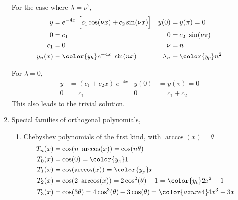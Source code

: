\begin{enumerate}
          For the case where $ \lambda = \nu^2 $,
          \begin{align}
              y         & = e^{-4x}\ \Big[ c_1 \cos(\nu x) + c_2 \sin(\nu x) \Big] &
              y(0)      & = y(\pi) = 0                                               \\
              0         & = c_1                                                    &
              0         & = c_2\ \sin(\nu \pi)                                       \\
              c_1       & = 0                                                      &
              \nu       & = n                                                        \\
              y_n(x)    & = \color{y_h} e^{-4x}\ \sin(nx)                          &
              \lambda_n & = \color{y_p} n^2
          \end{align}

          For $ \lambda = 0 $,
          \begin{align}
              y    & = (c_1 + c_2x)\ e^{-4x} &
              y(0) & = y(\pi) = 0              \\
              0    & = c_1                   &
              0    & = c_1 + c_2
          \end{align}
          This also leads to the trivial solution.

    \item Special families of orthogonal polynomials,
          \begin{enumerate}
              \item Chebyshev polynomials of the first kind, with
                    $ \arccos(x) = \theta $
                    \begin{align}
                        T_n(x) & = \cos (n\ \arccos(x)) = \cos(n\theta)             \\
                        T_0(x) & = \cos(0) = \color{y_h} 1                          \\
                        T_1(x) & = \cos(\arccos(x)) = \color{y_p} x                 \\
                        T_2(x) & = \cos(2\ \arccos(x)) = 2 \cos^2(\theta) - 1
                        = \color{y_t} 2x^2 - 1                                      \\
                        T_3(x) & = \cos(3 \theta) = 4\cos^3(\theta) - 3\cos(\theta)
                        = \color{azure4} 4x^3 - 3x
                    \end{align}


\end{enumerate}
\end{enumerate}
